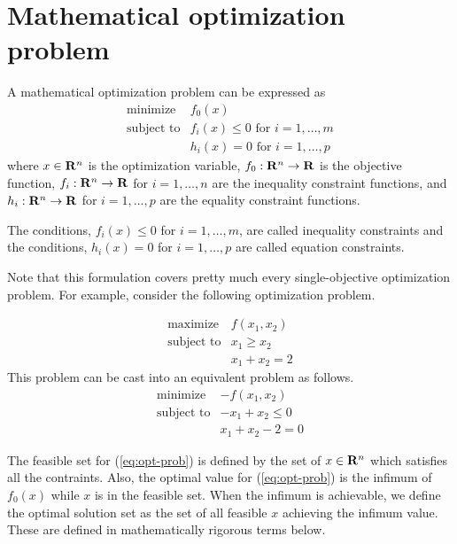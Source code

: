 
\section{Mathematical optimization problem}

A mathematical optimization problem can be expressed as
\begin{equation}
\label{eq:opt-prob}
\begin{array}{ll}
\mbox{minimize} & f_0(x)
\\
\mbox{subject to} & f_i(x) \leq 0 \mbox{ for } i = 1, \ldots, m
\\
& h_i(x) = 0 \mbox{ for } i = 1, \ldots, p
\end{array}
\end{equation}
where
$x\in\mathbf{R}^n$ is the optimization variable,
$f_0:\mathbf{R}^n\to\mathbf{R}$ is the objective function,
$f_i:\mathbf{R}^n\to\mathbf{R}$ for $i=1,\ldots,n$ are the inequality constraint functions,
and
$h_i:\mathbf{R}^n\to\mathbf{R}$ for $i=1,\ldots,p$ are the equality constraint functions.

The conditions, $f_i(x) \leq 0$ for $ i = 1, \ldots, m$, are called inequality constraints
and the conditions, $ h_i(x) = 0 $ for $ i = 1, \ldots, p$ are called equation constraints.

Note that this formulation covers pretty much every single-objective optimization problem.
For example,
consider the following optimization problem.

\begin{equation}
\begin{array}{ll}
\mbox{maximize} & f(x_1,x_2)
\\
\mbox{subject to} & x_1 \geq x_2
\\
& x_1 + x_2 = 2
\end{array}
\end{equation}
This problem can be cast into an equivalent problem as follows.
\begin{equation}
\begin{array}{ll}
\mbox{minimize} & -f(x_1,x_2)
\\
\mbox{subject to} & - x_1 + x_2 \leq 0
\\
& x_1 + x_2 - 2 = 0
\end{array}
\end{equation}


The feasible set for (\ref{eq:opt-prob}) is defined by the set of $x\in\mathbf{R}^n$ which satisfies all the contraints.
Also, the optimal value for (\ref{eq:opt-prob}) is the infimum of $f_0(x)$ while $x$ is in the feasible set.
When the infimum is achievable, we define the optimal solution set as the set of all feasible $x$ achieving
the infimum value.
These are defined in mathematically rigorous terms below.

